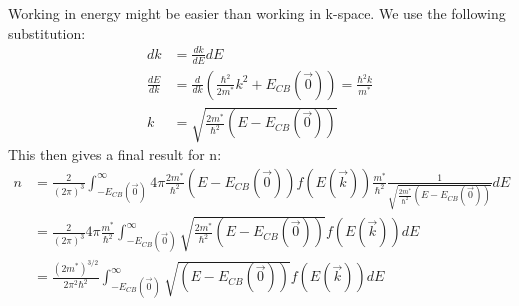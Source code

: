 Working in energy might be easier than working in k-space. We use the following substitution:
\begin{align}
	dk &= \frac{dk}{dE}dE \\
	\frac{dE}{dk} &= \frac{d}{dk}(\frac{\hbar^2}{2m^*}k^2 + E_{CB}(\vec{0})) = \frac{\hbar^2 k}{m^*} \\
	k &= \sqrt{\frac{2m^*}{\hbar^2}(E-E_{CB}(\vec{0}))}
\end{align}
This then gives a final result for n:
\begin{align}
	n &= \frac{2}{(2\pi)^3}\int_{-E_{CB}(\vec{0})}^{\infty} 4\pi \frac{2m^*}{\hbar^2}(E-E_{CB}(\vec{0})) f(E(\vec{k})) \frac{m^*}{\hbar^2} \frac{1}{\sqrt{\frac{2m^*}{\hbar^2}(E-E_{CB}(\vec{0}))}} dE\\
	&= \frac{2}{(2\pi)^3} 4\pi \frac{m^*}{\hbar^2} \int_{-E_{CB}(\vec{0})}^{\infty} \sqrt{\frac{2m^*}{\hbar^2}(E-E_{CB}(\vec{0}))} f(E(\vec{k})) dE \\
	&= \frac{(2m^*)^{3/2}}{2\pi^2\hbar^2} \int_{-E_{CB}(\vec{0})}^{\infty} \sqrt{(E-E_{CB}(\vec{0}))} f(E(\vec{k})) dE \label{eqn:dinsity_}
\end{align}

